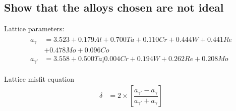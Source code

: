 \clearpage
\section{}

\subsection{Show that the alloys chosen are not ideal}

Lattice parameters:
\begin{align}
    \begin{split}
        a_\gamma &= 3.523 + 0.179 Al + 0.700Ta + 0.110 Cr + 0.444W+ 0.441 Re \\
        & + 0.478Mo + 0.096 Co \\
        a_{\gamma'} &= 3.558 + 0.500Ta ¡ 0.004 Cr + 0.194W+ 0.262 Re + 0.208Mo
    \end{split}
\end{align}

Lattice misfit equation
\begin{align}
    \delta &= 2\times\left[\dfrac{a_{\gamma'}-a_\gamma}{a_{\gamma'}+a_\gamma}\right]
\end{align}

